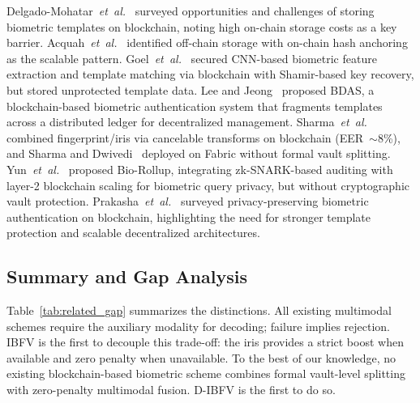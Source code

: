 \documentclass[3p,twocolumn]{elsarticle}
\newcommand{\IBFV}{\textsf{IBFV}}
\newcommand{\DIBFV}{\textsf{D-IBFV}}
\begin{document}
Delgado-Mohatar~\textit{et~al.}~\cite{delgado2020blockchain} surveyed opportunities and challenges of storing biometric templates on blockchain, noting high on-chain storage costs as a key barrier. Acquah~\textit{et~al.}~\cite{acquah2020securing} identified off-chain storage with on-chain hash anchoring as the scalable pattern. Goel~\textit{et~al.}~\cite{goel2019securing} secured CNN-based biometric feature extraction and template matching via blockchain with Shamir-based key recovery, but stored unprotected template data. Lee and Jeong~\cite{lee2021securing} proposed BDAS, a blockchain-based biometric authentication system that fragments templates across a distributed ledger for decentralized management. Sharma~\textit{et~al.}~\cite{sharma2024multimodal} combined fingerprint/iris via cancelable transforms on blockchain (EER~$\sim$8\%), and Sharma and Dwivedi~\cite{sharma2026fabric} deployed on Fabric without formal vault splitting. Yun~\textit{et~al.}~\cite{yun2024biorollup} proposed Bio-Rollup, integrating zk-SNARK-based auditing with layer-2 blockchain scaling for biometric query privacy, but without cryptographic vault protection. Prakasha~\textit{et~al.}~\cite{prakasha2025privacy} surveyed privacy-preserving biometric authentication on blockchain, highlighting the need for stronger template protection and scalable decentralized architectures.

\subsection{Summary and Gap Analysis}

Table~\ref{tab:related_gap} summarizes the distinctions. All existing multimodal schemes require the auxiliary modality for decoding; failure implies rejection. \IBFV{} is the first to decouple this trade-off: the iris provides a strict boost when available and zero penalty when unavailable. To the best of our knowledge, no existing blockchain-based biometric scheme combines formal vault-level splitting with zero-penalty multimodal fusion. \DIBFV{} is the first to do so.
\end{document}
